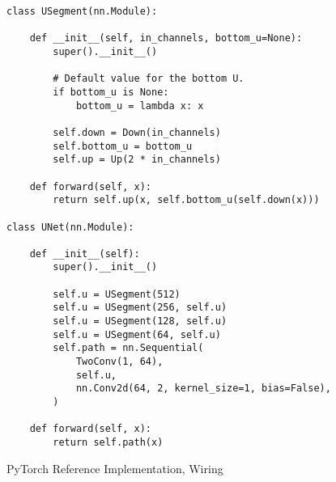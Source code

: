 \documentclass[10pt,twocolumn,english,format=sigplan,screen,balance]{acmart}
\begin{document}
\begin{figure*}
\begin{verbatim}
class USegment(nn.Module):

    def __init__(self, in_channels, bottom_u=None):
        super().__init__()

        # Default value for the bottom U.
        if bottom_u is None:
            bottom_u = lambda x: x

        self.down = Down(in_channels)
        self.bottom_u = bottom_u
        self.up = Up(2 * in_channels)

    def forward(self, x):
        return self.up(x, self.bottom_u(self.down(x)))

class UNet(nn.Module):

    def __init__(self):
        super().__init__()

        self.u = USegment(512)
        self.u = USegment(256, self.u)
        self.u = USegment(128, self.u)
        self.u = USegment(64, self.u)
        self.path = nn.Sequential(
            TwoConv(1, 64),
            self.u,
            nn.Conv2d(64, 2, kernel_size=1, bias=False),
        )

    def forward(self, x):
        return self.path(x)
\end{verbatim}
\caption{PyTorch Reference Implementation, Wiring}

\end{figure*}
\end{document}
